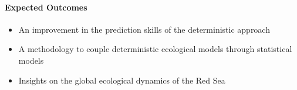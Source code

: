 \paragraph{Expected Outcomes}

\begin{itemize}
  \item An improvement in the prediction skills of the deterministic approach
  \item A methodology to couple deterministic ecological models through statistical models
  \item Insights on the global ecological dynamics of the Red Sea
\end{itemize}

